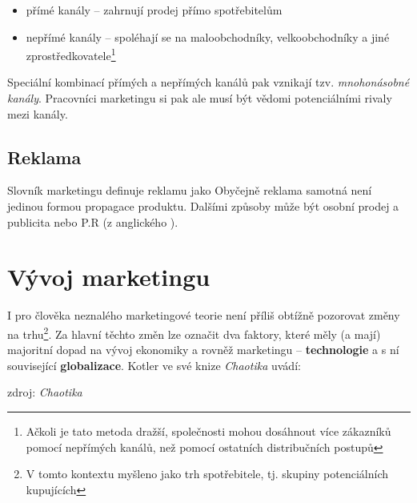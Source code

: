 \begin{itemize}
    \item přímé kanály -- zahrnují prodej přímo spotřebitelům
    \item nepřímé kanály -- spoléhají se na maloobchodníky, velkoobchodníky a jiné zprostředkovatele\footnote{Ačkoli je tato metoda dražší, společnosti mohou dosáhnout více zákazníků pomocí nepřímých kanálů, než pomocí ostatních distribučních postupů\cite["marketingový mix", s. 114]{clemente2004slovnikmarketingu}}
\end{itemize}

Speciální kombinací přímých a nepřímých kanálů pak vznikají tzv. \textit{mnohonásobné kanály}. Pracovníci marketingu si pak ale musí být vědomi potenciálními rivaly mezi kanály.


\subsection{Reklama}
Slovník marketingu definuje reklamu jako \cite["reklama", s. 115]{clemente2004slovnikmarketingu} Obyčejně reklama samotná není jedinou formou propagace produktu. Dalšími způsoby může být osobní prodej a publicita nebo P.R (z anglického ).


\section{Vývoj marketingu}

I pro člověka neznalého marketingové teorie není příliš obtížně pozorovat změny na trhu\footnote{V tomto kontextu myšleno jako trh spotřebitele, tj. skupiny potenciálních kupujících}.
Za hlavní  těchto změn lze označit dva faktory, které měly (a mají) majoritní dopad na vývoj ekonomiky a rovněž marketingu -- \textbf{technologie} a s ní související \textbf{globalizace}. Kotler ve své knize \textit{Chaotika}\cite[s. 14]{kotler2009chaotika} uvádí:

\begin{aquote}{zdroj: \textit{Chaotika}}
\end{aquote}

